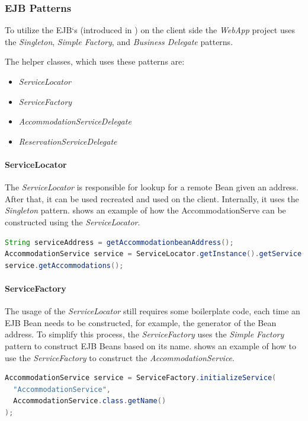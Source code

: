 \subsubsection{EJB Patterns}\label{sec:02_design_web_patterns}
To utilize the EJB`s (introduced in ) on the client side the \textit{WebApp} project uses the \textit{Singleton}, \textit{Simple Factory}, and \textit{Business Delegate} patterns.

The helper classes, which uses these patterns are:
\begin{itemize}
\item \textit{ServiceLocator}
\item \textit{ServiceFactory}
\item \textit{AccommodationServiceDelegate}
\item \textit{ReservationServiceDelegate}
\end{itemize}

\paragraph{ServiceLocator}
The \textit{ServiceLocator} is responsible for lookup for a remote Bean given an address. After that, it can be used recreated and used on the client. Internally, it uses the \textit{Singleton} pattern.  shows an example of how the AccommodationServe can be constructed using the \textit{ServiceLocator}.
\begin{lstlisting}[label=lst:02_design_web_pattern_servicelocator, caption=Example usage of the \textit{ServiceLocator}, language=java]
String serviceAddress = getAccommodationbeanAddress();
AccommodationService service = ServiceLocator.getInstance().getService(serviceAddress);
service.getAccommodations();
\end{lstlisting}

\paragraph{ServiceFactory}
The usage of the \textit{ServiceLocator} still requires some boilerplate code, each time an EJB Bean needs to be constructed, for example, the generator of the Bean address. To simplify this process, the \textit{ServiceFactory} uses the \textit{Simple Factory} pattern to construct EJB Beans based on its name.  shows an example of how to use the \textit{ServiceFactory} to construct the \textit{AccommodationService}.
\begin{lstlisting}[label=lst:02_design_web_pattern_servicefactory, caption=Example usage of the \textit{ServiceFactory}, language=java]
AccommodationService service = ServiceFactory.initializeService(
  "AccommodationService",
  AccommodationService.class.getName()
);
\end{lstlisting}

